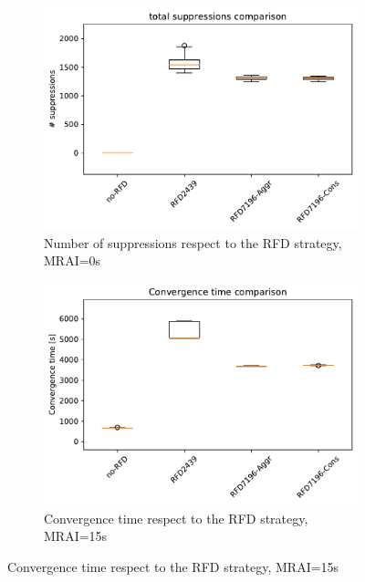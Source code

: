 \begin{figure}[H]
\begin{subfigure}[b]{0.325\textwidth}
     \end{subfigure}
     \hfill
     \begin{subfigure}[b]{0.325\textwidth}
         \centering
         \includegraphics[width=\textwidth]{images/RFD/miceVSelephants/MultiMRAI/0/elephants/cisco_1000MRAI0_rfd_comparison_suppressions_boxplot.pdf}
         \caption{Number of suppressions respect to the RFD strategy, MRAI=0s}
         \label{fig:1000_RFD_MRAI30_suppressions_elephant}
     \end{subfigure}
     \vfill
     \begin{subfigure}[b]{0.325\textwidth}
         \centering
         \includegraphics[width=\textwidth]{images/RFD/miceVSelephants/MultiMRAI/15/elephants/cisco_1000MRAI15_rfd_comparison_time_boxplot.pdf}
         \caption{Convergence time respect to the RFD strategy, MRAI=15s}

\end{subfigure}
\end{figure}
